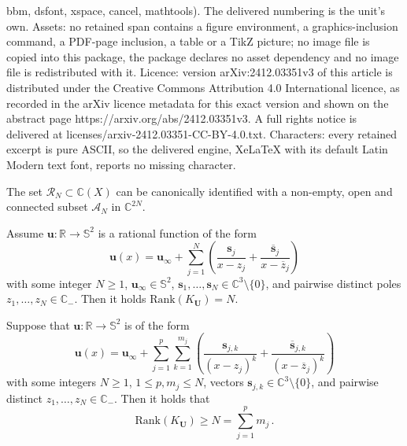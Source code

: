 \documentclass[10pt,a4paper]{amsart}
\newcommand{\C}{\mathbb{C}}
\newcommand{\R}{\mathbb{R}}
\newcommand{\Ss}{\mathbb{S}}
\newcommand{\Ub}{\mathbf{U}}
\newcommand{\ov}{\overline}
\newcommand{\sv}{\mathbf{s}}
\newcommand{\uu}{\mathbf{u}}
\renewcommand{\geq}{\geqslant}
\renewcommand{\leq}{\leqslant}
\begin{document}
bbm, dsfont, xspace, cancel, mathtools). The delivered numbering is the unit's own. Assets: no retained span contains a figure environment, a graphics-inclusion command, a PDF-page inclusion, a table or a TikZ picture; no image file is copied into this package, the package declares no asset dependency and no image file is redistributed with it. Licence: version arXiv:2412.03351v3 of this article is distributed under the Creative Commons Attribution 4.0 International licence, as recorded in the arXiv licence metadata for this exact version and shown on the abstract page https://arxiv.org/abs/2412.03351v3. A full rights notice is delivered at licenses/arxiv-2412.03351-CC-BY-4.0.txt. Characters: every retained excerpt is pure ASCII, so the delivered engine, XeLaTeX with its default Latin Modern text font, reports no missing character.
\begin{lem} \label{lem:R_n}
The set $\mathcal{R}_N \subset \C(X)$ can be canonically identified with a non-empty, open and connected subset $\mathcal{A}_N$ in $\C^{2N}$. 
\end{lem}

\begin{lem} \label{lem:simple_poles}
Assume $\uu : \R \to \Ss^2$ is a rational function of the form
$$
\uu(x) = \uu_\infty + \sum_{j=1}^N \left ( \frac{\sv_j}{x-z_j} + \frac{\ov{\sv}_j}{x-\ov{z}_j} \right )
$$
with some integer $N \geq 1$, $\uu_\infty \in \Ss^2$, $\sv_1, \ldots, \sv_N \in \C^3 \setminus \{ 0 \}$, and pairwise distinct poles $z_1, \ldots, z_N \in \C_-$. Then it holds $\mathrm{Rank} (K_{\Ub}) = N$.
\end{lem}

\begin{lem} \label{lem:mult_poles}
Suppose that $\uu : \R \to \Ss^2$ is of the form
$$
\uu(x) = \uu_\infty + \sum_{j=1}^p \sum_{k=1}^{m_j} \left ( \frac{\sv_{j,k}}{(x-z_j)^k} + \frac{\ov{\sv}_{j,k}}{(x-\ov{z}_j)^k} \right )
$$
with some integers $N \geq 1$, $1 \leq p,m_j \leq N$, vectors $\sv_{j,k} \in \C^3 \setminus \{ 0 \}$, and pairwise distinct $z_1, \ldots, z_N \in \C_-$. Then it holds that
$$
\mathrm{Rank}(K_\Ub) \geq N = \sum_{j=1}^p m_j \, .
$$
\end{lem}
\end{document}
